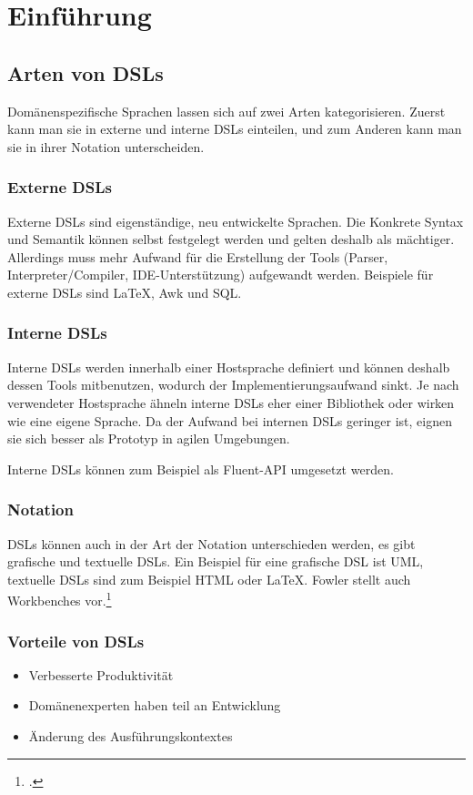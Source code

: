 \documentclass[../InterneDSLs.tex]{subfiles}
\begin{document}
\section{Einführung}

\subsection{Arten von DSLs}
Domänenspezifische Sprachen lassen sich auf zwei Arten kategorisieren. Zuerst kann man sie in externe und interne DSLs einteilen, und zum Anderen kann man sie in ihrer Notation unterscheiden.

\subsubsection{Externe DSLs}
Externe DSLs sind eigenständige, neu entwickelte Sprachen. Die \gls{Konkrete Syntax} und Semantik können selbst festgelegt werden und gelten deshalb als mächtiger. Allerdings muss mehr Aufwand für die Erstellung der Tools (Parser, Interpreter/Compiler, \acs{IDE}-Unterstützung) aufgewandt werden. Beispiele für externe DSLs sind LaTeX, Awk und SQL.

\subsubsection{Interne DSLs}
Interne DSLs werden innerhalb einer Hostsprache definiert und können deshalb dessen Tools mitbenutzen, wodurch der Implementierungsaufwand sinkt. Je nach verwendeter Hostsprache ähneln interne DSLs eher einer Bibliothek oder wirken wie eine eigene Sprache. Da der Aufwand bei internen DSLs geringer ist, eignen sie sich besser als Prototyp in agilen Umgebungen.~\cite{butting2018deriving}

Interne DSLs können zum Beispiel als Fluent-\acs{API} umgesetzt werden.

\subsubsection{Notation}
DSLs können auch in der Art der Notation unterschieden werden, es gibt grafische und textuelle DSLs. Ein Beispiel für eine grafische DSL ist UML, textuelle DSLs sind zum Beispiel HTML oder LaTeX. Fowler stellt auch Workbenches vor.\footcite[][S. 22ff]{Fowler.2010}

\subsubsection{Vorteile von DSLs}
\begin{itemize}
	\item Verbesserte Produktivität
	\item Domänenexperten haben teil an Entwicklung
	\item Änderung des Ausführungskontextes
\end{itemize}
\end{document}
